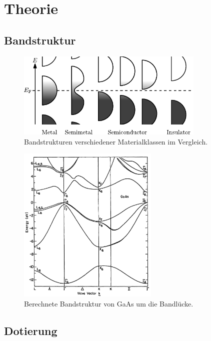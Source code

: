 \section[Theorie]{Theorie \textnormal{\cite{faraday}}}
\label{sec:theorie}

\subsection{Bandstruktur}

\begin{figure}
    \centering
    \includegraphics[width=0.8\textwidth]{content/grafik/bandstructure.pdf}
    \caption{Bandstrukturen verschiedener Materialklassen im Vergleich. \cite{wiki_band}}
    \label{fig:baender}
\end{figure}

\begin{figure}
    \centering
    \includegraphics[width=0.6\textwidth]{content/grafik/bandstruktur.jpg}
    \caption{Berechnete Bandstruktur von GaAs um die Bandlücke. \cite{coh_jam_el}}
    \label{fig:band}
\end{figure}

\subsection{Dotierung}

